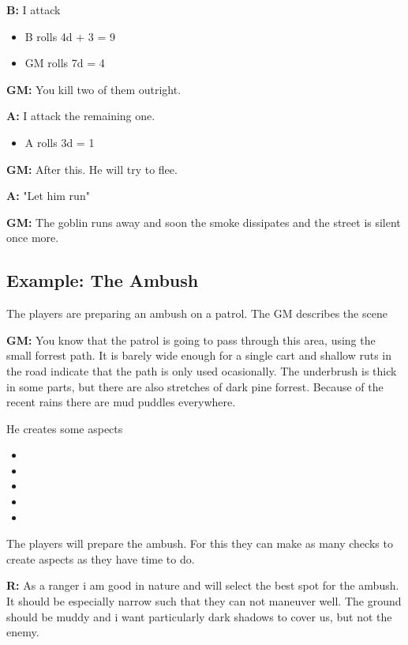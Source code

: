 \documentclass[11pt]{article}
\begin{document}
{\textbf{B:} I attack
\begin{itemize}
\item B rolls 4d + 3 = 9
\item GM rolls 7d = 4
\end{itemize}

\textbf{GM:} You kill two of them outright.

\textbf{A:} I attack the remaining one.
\begin{itemize}
\item A rolls 3d = 1
\end{itemize}

\textbf{GM:} After this. He will try to flee.

\textbf{A:} "Let him run"

\textbf{GM:} The goblin runs away and soon the smoke dissipates and the street is silent once more.

\subsection{Example: The Ambush}
\label{sec:org4d19697}

The players are preparing an ambush on a patrol. The GM describes the scene

\textbf{GM:} You know that the patrol is going to pass through this area, using the small forrest path. It is barely wide enough for a single cart and shallow ruts in the road indicate that the path is only used ocasionally. The underbrush is thick in some parts, but there are also stretches of dark pine forrest. Because of the recent rains there are mud puddles everywhere.

He creates some aspects
\begin{itemize}
\item {}
\item {}
\item {}
\item {}
\item {}
\end{itemize}

The players will prepare the ambush. For this they can make as many checks to create aspects as they have time to do.

\textbf{R:} As a ranger i am good in nature and will select the best spot for the ambush. It should be especially narrow such that they can not maneuver well. The ground should be muddy and i want particularly dark shadows to cover us, but not the enemy.

}
\end{document}
